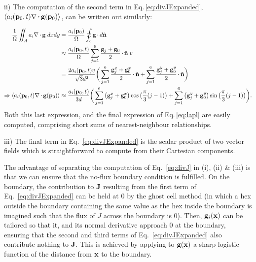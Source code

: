 \documentclass[9pt,lineno]{elife}
\begin{document}
ii) The computation of the second term in Eq.\,\ref{eq:divJExpanded},
$\langle a_i(\mb{p}_0,t)\nabla\vcdot\mb{g}(\mb{p}_0)\rangle$, can be written out similarly:

\begin{equation} \label{eq:divg}
\begin{split}
%
\frac{1}{\Omega} \iint_A a_i\nabla\vcdot\mb{g}\;dxdy & = \frac{a_i(\mb{p}_0)}{\Omega}  \oint_c \mb{g}\vcdot d\hat{\mathbf{n}} \\
%
& \approx \frac{a_i(\mb{p}_0,t)}{\Omega} \sum_{j=1}^{6} \frac{\mb{g}_j + \mb{g}_0}{2}\vcdot \hat{\mb{n}}\;v \\
%
& = \frac{2 a_i(\mb{p}_0,t)v}{\sqrt{3}d^2} \bigg( \sum_{j=1}^{6} \frac{\mb{g}_j^x + \mb{g}_0^x}{2} \vcdot  \hat{\mb{n}} + \sum_{j=1}^{6} \frac{\mb{g}_j^y + \mb{g}_0^y}{2} \vcdot  \hat{\mb{n}} \bigg) \\
%
%
\Rightarrow \langle a_i(\mb{p}_0,t)\nabla\vcdot\mb{g}(\mb{p}_0)\rangle & \approx \frac{a_i(\mb{p}_0,t)}{3d} \bigg( \sum_{j=1}^{6} \big(\mb{g}_j^x + \mb{g}_0^x\big) \cos \big(\frac{\pi}{3}(j-1)\big) + \sum_{j=1}^{6} \big({\mb{g}_j^y + \mb{g}_0^y}\big) \sin \big(\frac{\pi}{3}(j-1)\big) \bigg). \\
%
\end{split}
\end{equation}
%
Both this last expression, and the final expression of Eq.\,\ref{eq:lapl} are
easily computed, comprising short sums of nearest-neighbour relationships.

iii) The final term in Eq.~\ref{eq:divJExpanded} is the scalar product of two
vector fields which is straightforward to compute from their Cartesian
components.

The advantage of separating the computation of Eq.~\ref{eq:divJ} in (i), (ii)
\& (iii) is that we can ensure that the no-flux boundary condition is
fulfilled. On the boundary, the contribution to $\mathbf{J}$ resulting from the
first term of Eq.~\ref{eq:divJExpanded} can be held at 0 by the ghost cell
method (in which a hex outside the boundary containing the same value as the
hex inside the boundary is imagined such that the flux of $J$ across the
boundary is 0). Then, $\mathbf{g}_i(\mathbf{x})$ can be tailored so that it, and its
normal derivative approach 0 at the boundary, ensuring that the second and
third terms of Eq.~\ref{eq:divJExpanded} also contribute nothing to
$\mathbf{J}$. This is achieved by applying to $\mathbf{g}(\mathbf{x})$ a sharp logistic
function of the distance from $\mathbf{x}$ to the boundary.
\end{document}
